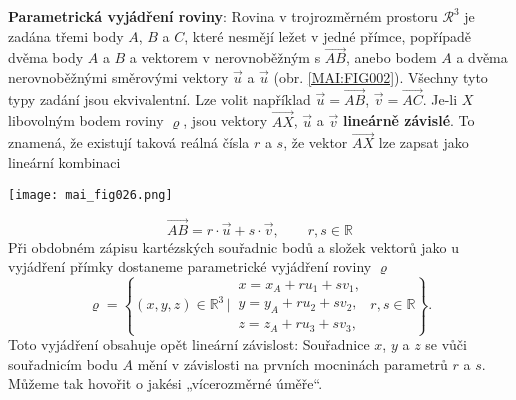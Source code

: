 \wikitextrule
\begin{example}\label{mai:exam004}
  \textbf{Parametrická vyjádření roviny}:\newline\small
  Rovina v trojrozměrném prostoru \(\mathcal{R}^3\) je zadána třemi body \(A\), \(B\) a \(C\), 
  které nesmějí ležet v jedné přímce, popřípadě dvěma body \(A\) a \(B\) a vektorem v nerovnoběžným 
  s \(\overrightarrow{AB}\), anebo bodem \(A\) a dvěma nerovnoběžnými směrovými vektory \(\vec{u}\) 
  a \(\vec{u}\) (obr. \ref{MAI:FIG002}). Všechny tyto typy zadání jsou ekvivalentní. Lze volit 
  například \(\vec{u} = \overrightarrow{AB}\), \(\vec{v} = \overrightarrow{AC}\). Je-li \(X\) 
  libovolným bodem roviny \(\varrho\), jsou vektory \(\overrightarrow{AX}\), \(\vec{u}\) a 
  \(\vec{v}\) \textbf{lineárně závislé}. To znamená, že existují taková reálná čísla \(r\) a \(s\), 
  že vektor \(\overrightarrow{AX}\) lze zapsat jako lineární kombinaci

  {\centering
    \captionsetup{type=figure}
    \texttt{[image: mai\_fig026.png]}
    \par}  
  
  \begin{equation*}
    \overrightarrow{AB} = r\cdot\vec{u} + s\cdot\vec{v}, \qquad r,s \in\mathbb{R}
  \end{equation*}
  Při obdobném zápisu kartézských souřadnic bodů a složek vektorů jako u vyjádření přímky dostaneme
  parametrické vyjádření roviny \(\varrho\)
  \begin{equation}\label{mai:eq039}
    \varrho = \left\{(x,y,z)\in\mathbb{R}^3\,|\,
    \begin{matrix}
      x = x_A + ru_1 + sv_1,        \\
      y = y_A + ru_2 + sv_2,        \\
      z = z_A + ru_3 + sv_3,
    \end{matrix}
    \;r,s\in\mathbb{R}
    \right\}. 
  \end{equation}
  Toto vyjádření obsahuje opět lineární závislost: Souřadnice \(x\), \(y\) a \(z\) se vůči 
  souřadnicím bodu \(A\) mění v závislosti na prvních mocninách parametrů \(r\) a \(s\). Můžeme tak 
  hovořit o jakési „vícerozměrné úměře“.
  \normalsize
\end{example}
  